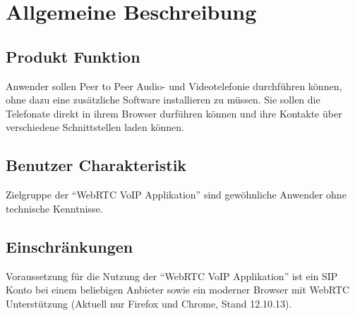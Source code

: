 \chapter{Allgemeine Beschreibung}


\section{Produkt Funktion}
Anwender sollen Peer to Peer Audio- und Videotelefonie durchführen können, ohne dazu eine zusätzliche Software installieren zu müssen. Sie sollen die Telefonate direkt in ihrem Browser durführen können und ihre Kontakte über verschiedene Schnittstellen laden können.

\section{Benutzer Charakteristik}
Zielgruppe der ``WebRTC VoIP Applikation'' sind gewöhnliche Anwender ohne technische Kenntnisse.

\section{Einschränkungen}
Voraussetzung für die Nutzung der ``WebRTC VoIP Applikation'' ist ein SIP Konto bei einem beliebigen Anbieter sowie ein moderner Browser mit WebRTC Unterstützung (Aktuell nur Firefox und Chrome, Stand 12.10.13).


